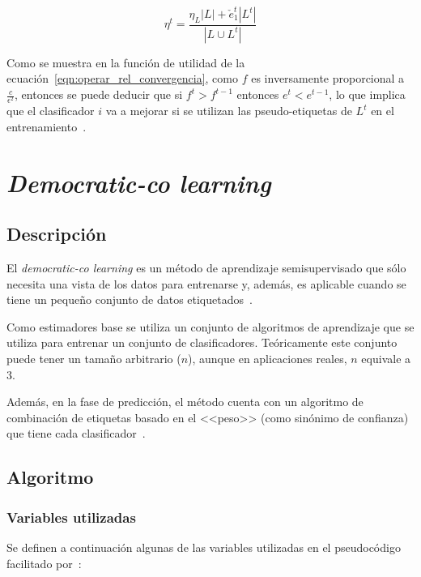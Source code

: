 \begin{equation}\label{eqn:ruido_it_tritraining} \eta^{t} = \frac{\eta_{L}|L| + \check{e}_{1}^{t}|L^{t}|}{|L \cup L^{t}|} \end{equation} 

Como se muestra en la función de utilidad de la ecuación~\ref{eqn:operar_rel_convergencia}, como $f$ es inversamente proporcional a  $\frac{c}{\epsilon^{2}}$, entonces se puede deducir que si $f^t > f^{t-1}$ entonces $e^t < e^{t-1}$, lo que implica que el clasificador $i$ va a mejorar si se utilizan las pseudo-etiquetas de $L^t$ en el entrenamiento~\cite{tritraining2005@original}.

\section{\textit{Democratic-co learning}}

\subsection{Descripción}

El \textit{democratic-co learning} es un método de aprendizaje semisupervisado que sólo necesita una vista de los datos para entrenarse y, además, es aplicable cuando se tiene un pequeño conjunto de datos etiquetados~\cite{democraticCoLearning2004original}.

Como estimadores base se utiliza un conjunto de algoritmos de aprendizaje que se utiliza para entrenar un conjunto de clasificadores. Teóricamente este conjunto puede tener un tamaño arbitrario ($n$), aunque en aplicaciones reales, $n$ equivale a $3$.

Además, en la fase de predicción, el método cuenta con un algoritmo de combinación de etiquetas basado en el <<peso>> (como sinónimo de confianza) que tiene cada clasificador~\cite{democraticCoLearning2004original}.

\subsection{Algoritmo}

\subsubsection{Variables utilizadas}

Se definen a continuación algunas de las variables utilizadas en el pseudocódigo facilitado por~\cite{democraticCoLearning2004original}:

